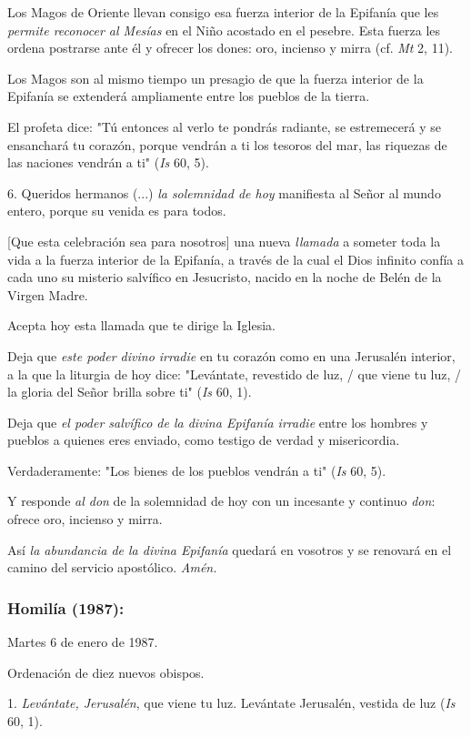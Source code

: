 \begin{body}
Los Magos de Oriente llevan consigo esa fuerza interior de la Epifanía que les \emph{permite reconocer al Mesías} en el Niño acostado en el pesebre. Esta fuerza les ordena postrarse ante él y ofrecer los dones: oro, incienso y mirra (cf. \emph{Mt} 2, 11).

Los Magos son al mismo tiempo un presagio de que la fuerza interior de la Epifanía se extenderá ampliamente entre los pueblos de la tierra.

El profeta dice: "Tú entonces al verlo te pondrás radiante, se estremecerá y se ensanchará tu corazón, porque vendrán a ti los tesoros del mar, las riquezas de las naciones vendrán a ti" (\emph{Is} 60, 5).

6. Queridos hermanos (...) \emph{la solemnidad de hoy} manifiesta al Señor al mundo entero, porque su venida es para todos.

{[}Que esta celebración sea para nosotros{]} una nueva \emph{llamada} a someter toda la vida a la fuerza interior de la Epifanía, a través de la cual el Dios infinito confía a cada uno su misterio salvífico en Jesucristo, nacido en la noche de Belén de la Virgen Madre.

Acepta hoy esta llamada que te dirige la Iglesia.

Deja que \emph{este poder divino irradie} en tu corazón como en una Jerusalén interior, a la que la liturgia de hoy dice: "Levántate, revestido de luz, / que viene tu luz, / la gloria del Señor brilla sobre ti" (\emph{Is} 60, 1).

Deja que \emph{el poder salvífico de la divina Epifanía irradie} entre los hombres y pueblos a quienes eres enviado, como testigo de verdad y misericordia.

Verdaderamente: "Los bienes de los pueblos vendrán a ti" (\emph{Is} 60, 5).

Y responde \emph{al don} de la solemnidad de hoy con un incesante y continuo \emph{don}: ofrece oro, incienso y mirra.

Así \emph{la abundancia de la divina Epifanía} quedará en vosotros y se renovará en el camino del servicio apostólico. \emph{Amén.}

\subsubsection{Homilía (1987): }

Martes 6 de enero de 1987.

Ordenación de diez nuevos obispos.

1. \emph{Levántate, Jerusalén}, que viene tu luz. Levántate Jerusalén, vestida de luz (\emph{Is} 60, 1).


\end{body}
